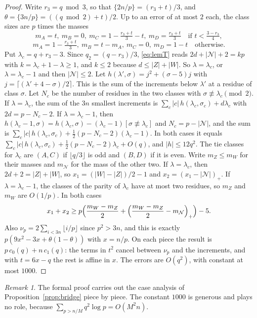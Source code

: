 \documentclass[11pt]{amsart}
\theoremstyle{definition}
\theoremstyle{remark}
\newtheorem{remark}[theorem]{Remark}
\numberwithin{equation}{section}
\newcommand{\fr}[1]{\{#1\}}
\begin{document}
\begin{proof}
Write $r_3=q\bmod3$, so that $\fr{2n/p}=(r_3+t)/3$, and $\theta=\fr{3n/p}=((q\bmod2)+t)/2$. Up to an error of at most
$2$ each, the class sizes are $p$ times the masses
\[
 m_A=t,\ m_B=0,\ m_C=1-\tfrac{r_3+t}3-t,\ m_D=\tfrac{r_3+t}3\quad\text{if }t<\tfrac{3-r_3}4,
\]
\[
 m_A=1-\tfrac{r_3+t}3,\ m_B=t-m_A,\ m_C=0,\ m_D=1-t\quad\text{otherwise.}
\]
Put $\lambda_c=q+r_3-3$. Since $q_2=(q-r_3)/3$, \eqref{eq:lemT} reads $2d+|\mathcal N|+2=kp$ with
$k=\lambda_c+1-\lambda\ge1$, and $k\le2$ because $d\le|Z|+|W|$. So $\lambda=\lambda_c$, or $\lambda=\lambda_c-1$ and then
$|\mathcal N|\le2$. Let $h(\lambda',\sigma)=j^2+(\sigma-5)j$ with $j=\lceil(\lambda'+4-\sigma)/2\rceil$. This is the
sum of the increments below $\lambda'$ at a residue of class $\sigma$. Let $N_c$ be the number of residues in the two
classes with $\sigma\not\equiv\lambda_c\pmod2$. If $\lambda=\lambda_c$, the sum of the $3n$ smallest increments is
$\sum_c|c|\,h(\lambda_c,\sigma_c)+d\lambda_c$ with $2d=p-N_c-2$. If $\lambda=\lambda_c-1$, then
$h(\lambda_c-1,\sigma)=h(\lambda_c,\sigma)-(\lambda_c-1)[\sigma\not\equiv\lambda_c]$ and $N_c=p-|\mathcal N|$, and the sum
is $\sum_c|c|\,h(\lambda_c,\sigma_c)+\frac12(p-N_c-2)(\lambda_c-1)$. In both cases it equals
$\sum_c|c|\,h(\lambda_c,\sigma_c)+\frac12(p-N_c-2)\lambda_c+O(q)$, and $|h|\le12q^2$. The tie classes for $\lambda_c$ are
$(A,C)$ if $\lfloor q/3\rfloor$ is odd and $(B,D)$ if it is even. Write $m_Z\le m_W$ for their masses and $m_{\mathcal N}$
for the mass of the other two. If $\lambda=\lambda_c$, then $2d+2=|Z|+|W|$, so $x_1=(|W|-|Z|)/2-1$ and
$x_2=(x_1-|\mathcal N|)_+$. If $\lambda=\lambda_c-1$, the classes of the parity of $\lambda_c$ have at most two residues,
so $m_Z$ and $m_W$ are $O(1/p)$. In both cases
\[
 x_1+x_2\ge p\Bigl(\frac{m_W-m_Z}2+\Bigl(\frac{m_W-m_Z}2-m_{\mathcal N}\Bigr)_+\Bigr)-5 .
\]
Also $\nu_p=2\sum_{i<3n}\lfloor i/p\rfloor$ since $p^2>3n$, and this is exactly $p(9x^2-3x+\theta(1-\theta))$ with $x=n/p$. On each piece the result is $p\,c_0(q)+n\,c_1(q)$: the terms in $t^2$
cancel between $\nu_p$ and the increments, and with $t=6x-q$ the rest is affine in $x$. The errors are $O(q^2)$, with
constant at most $1000$.
\end{proof}

\begin{remark}
The formal proof carries out the case analysis of Proposition~\ref{prop:bridge} piece by piece. The constant $1000$
is generous and plays no role, because $\sum_{p>n/M}q^2\log p=O(M^2n)$.
\end{remark}
\end{document}

